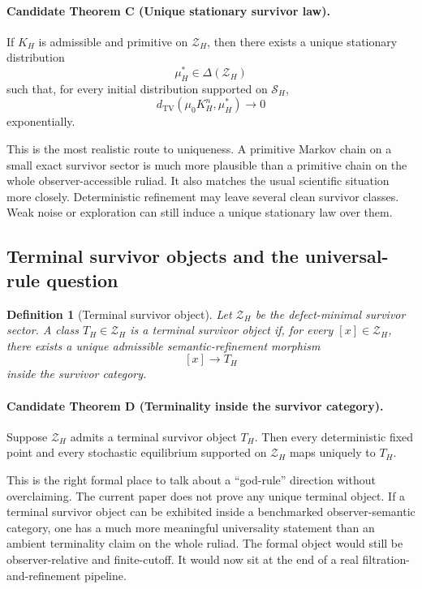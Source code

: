 \documentclass[11pt]{article}
\newtheorem{definition}[theorem]{Definition}
\theoremstyle{remark}
\theoremstyle{plain}
\begin{document}
\paragraph{Candidate Theorem C (Unique stationary survivor law).}
If \(K_H\) is admissible and primitive on \(\mathcal Z_H\), then there exists a unique stationary distribution
\[
\mu_H^\ast\in\Delta(\mathcal Z_H)
\]
such that, for every initial distribution supported on \(\mathcal S_H\),
\[
d_{\mathrm{TV}}(\mu_0K_H^n,\mu_H^\ast)\to 0
\]
exponentially.

This is the most realistic route to uniqueness. A primitive Markov chain on a small exact survivor sector is much more plausible than a primitive chain on the whole observer-accessible ruliad. It also matches the usual scientific situation more closely. Deterministic refinement may leave several clean survivor classes. Weak noise or exploration can still induce a unique stationary law over them.

\subsection{Terminal survivor objects and the universal-rule question}

\begin{definition}[Terminal survivor object]
Let \(\mathcal Z_H\) be the defect-minimal survivor sector. A class \(T_H\in\mathcal Z_H\) is a terminal survivor object if, for every \([x]\in\mathcal Z_H\), there exists a unique admissible semantic-refinement morphism
\[
[x]\to T_H
\]
inside the survivor category.
\end{definition}

\paragraph{Candidate Theorem D (Terminality inside the survivor category).}
Suppose \(\mathcal Z_H\) admits a terminal survivor object \(T_H\). Then every deterministic fixed point and every stochastic equilibrium supported on \(\mathcal Z_H\) maps uniquely to \(T_H\).

This is the right formal place to talk about a ``god-rule'' direction without overclaiming. The current paper does not prove any unique terminal object. If a terminal survivor object can be exhibited inside a benchmarked observer-semantic category, one has a much more meaningful universality statement than an ambient terminality claim on the whole ruliad. The formal object would still be observer-relative and finite-cutoff. It would now sit at the end of a real filtration-and-refinement pipeline.
\end{document}
